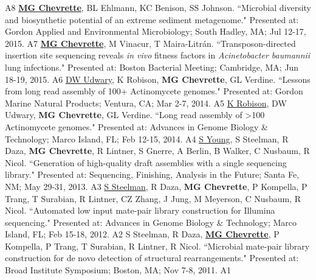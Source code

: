 \begin{cvpubs}
    {A8} %
  \cvpub
    {\textbf{\underline{MG Chevrette}}, BL Ehlmann, KC Benison, SS Johnson. ``Microbial diversity and biosynthetic potential of an extreme sediment metagenome." Presented at: Gordon Applied and Environmental Microbiology; South Hadley, MA; Jul 12-17, 2015.} %
    {A7} %
  \cvpub
    {\textbf{\underline{MG Chevrette}}, M Vinacur, T Maira-Litr\'{a}n. ``Transposon-directed insertion site sequencing reveals \textit{in vivo} fitness factors in \textit{Acinetobacter baumannii} lung infections." Presented at: Boston Bacterial Meeting; Cambridge, MA; Jun 18-19, 2015.} %
    {A6} %
  \cvpub
    {\underline{DW Udwary}, K Robison, \textbf{MG Chevrette}, GL Verdine. ``Lessons from long read assembly of 100+ Actinomycete genomes." Presented at: Gordon Marine Natural Products; Ventura, CA; Mar 2-7, 2014.} %
    {A5} %
  \cvpub
    {\underline{K Robison}, DW Udwary, \textbf{MG Chevrette}, GL Verdine. ``Long read assembly of >100 Actinomycete genomes." Presented at: Advances in Genome Biology \& Technology; Marco Island, FL; Feb 12-15, 2014.} %
    {A4} %
  \cvpub
    {\underline{S Young}, S Steelman, R Daza, \textbf{MG Chevrette}, R Lintner, S Gnerre, A Berlin, B Walker, C Nusbaum, R Nicol. ``Generation of high-quality draft assemblies with a single sequencing library." Presented at: Sequencing, Finishing, Analysis in the Future; Santa Fe, NM; May 29-31, 2013.} %
    {A3} %
  \cvpub
    {\underline{S Steelman}, R Daza, \textbf{MG Chevrette}, P Kompella, P Trang, T Surabian, R Lintner, CZ Zhang, J Jung, M Meyerson, C Nusbaum, R Nicol. ``Automated low input mate-pair library construction for Illumina sequencing." Presented at: Advances in Genome Biology \& Technology; Marco Island, FL; Feb 15-18, 2012.} %
    {A2} %
  \cvpub
    {S Steelman, R Daza, \underline{\textbf{MG Chevrette}}, P Kompella, P Trang, T Surabian, R Lintner, R Nicol. ``Microbial mate-pair library construction for de novo detection of structural rearrangements." Presented at: Broad Institute Symposium; Boston, MA; Nov 7-8, 2011.} %
    {A1} %
\end{cvpubs}